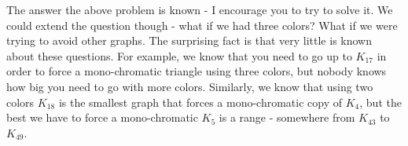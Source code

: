 \documentclass[12pt]{article}
\begin{document}
The answer the above problem is known - I encourage you to try to solve it.  We could extend the question though - what if we had three colors?  What if we were trying to avoid other graphs.  The surprising fact is that very little is known about these questions.  For example, we know that you need to go up to $K_{17}$ in order to force a mono-chromatic triangle using three colors, but nobody knows how big you need to go with more colors.  Similarly, we know that using two colors $K_{18}$ is the smallest graph that forces a mono-chromatic copy of $K_4$, but the best we have to force a mono-chromatic $K_{5}$ is a range - somewhere from $K_{43}$ to $K_{49}$.
\end{document}
